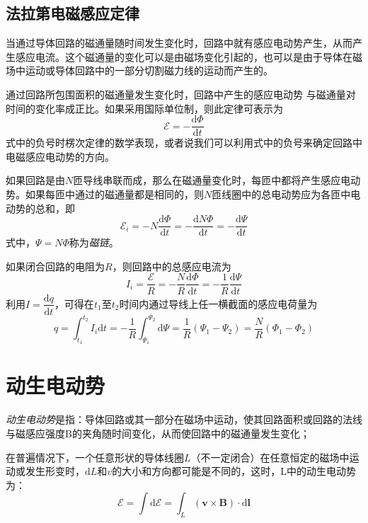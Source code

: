 \documentclass[12pt]{article}
\newcommand{\rmd}{\mathrm{d}}
\newcommand{\deriv}[2]{\frac{\rmd #1}{\rmd #2}}
\newcommand{\dderiv}[2]{\dfrac{\rmd #1}{\rmd #2}}
\begin{document}
\subsection{法拉第电磁感应定律}

当通过导体回路的磁通量随时间发生变化时，回路中就有感应电动势产生，从而产生感应电流。这个磁通量的变化可以是由磁场变化引起的，也可以是由于导体在磁场中运动或导体回路中的一部分切割磁力线的运动而产生的。

通过回路所包围面积的磁通量发生变化时，回路中产生的感应电动势 与磁通量对时间的变化率成正比。如果采用国际单位制，则此定律可表示为
\begin{equation}
    \mathcal{E} = - \deriv{\Phi}{t}
\end{equation}
式中的负号时楞次定律的数学表现，或者说我们可以利用式中的负号来确定回路中电磁感应电动势的方向。

如果回路是由\(N\)匝导线串联而成，那么在磁通量变化时，每匝中都将产生感应电动势。如果每匝中通过的磁通量都是相同的，则\(N\)匝线圈中的总电动势应为各匝中电动势的总和，即
\begin{equation}
    \mathcal{E}_i = - N \deriv{\varPhi}{t} = -\deriv{N \varPhi}{t} = -\deriv{\varPsi}{t}
\end{equation}
式中，\(\varPsi = N \varPhi\)称为\emph{磁链}。

如果闭合回路的电阻为\(R\)，则回路中的总感应电流为
\begin{equation}
    I_i = \frac{\mathcal{E}}{R} = -\frac{N}{R} \deriv{\varPhi}{t} = -\frac{1}{R} \deriv{\varPsi}{t}
\end{equation}
利用\(I = \dderiv{q}{t}\)，可得在\(t_1\)至\(t_2\)时间内通过导线上任一横截面的感应电荷量为
\begin{equation}
    q = \int_{t_1}^{t_2} I_i \rmd t = -\frac{1}{R} \int_{\varPsi_1}^{\varPsi_2} \rmd \varPsi = \frac{1}{R} \left(\varPsi_1 - \varPsi_2\right)= \frac{N}{R} \left(\varPhi_1 - \varPhi_2\right)
\end{equation}

\section{动生电动势}

\emph{动生电动势}是指：导体回路或其一部分在磁场中运动，使其回路面积或回路的法线与磁感应强度B的夹角随时间变化，从而使回路中的磁通量发生变化；

在普遍情况下，一个任意形状的导体线圈\(L\)（不一定闭合）在任意恒定的磁场中运动或发生形变时，\(\rmd L\)和\(v\)的大小和方向都可能是不同的，这时，L中的动生电动势为：
\begin{equation}
    \mathcal{E} = \int \rmd \mathcal{E} = \int_L \left(\boldsymbol{v} \times \boldsymbol{B}\right) \cdot \rmd \boldsymbol{l}
\end{equation}
\end{document}

